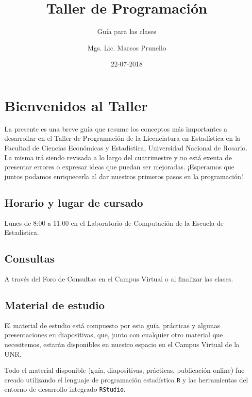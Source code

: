 \documentclass[]{book}
\title{Taller de Programación}
\subtitle{Guía para las clases}
\author{Mgs. Lic. Marcos Prunello}
\date{22-07-2018}
\begin{document}
\maketitle

{
\setcounter{tocdepth}{1}
\tableofcontents
}
\chapter{Bienvenidos al Taller}\label{bienvenidos-al-taller}

La presente es una breve guía que resume los conceptos más importantes a
desarrollar en el Taller de Programación de la Licenciatura en
Estadística en la Facultad de Ciencias Económicas y Estadística,
Universidad Nacional de Rosario. La misma irá siendo revisada a lo largo
del cuatrimestre y no está exenta de presentar errores o expresar ideas
que puedan ser mejoradas. ¡Esperamos que juntos podamos enriquecerla al
dar nuestros primeros pasos en la programación!

\section*{Horario y lugar de cursado}\label{horario-y-lugar-de-cursado}

Lunes de 8:00 a 11:00 en el Laboratorio de Computación de la Escuela de
Estadística.

\section*{Consultas}\label{consultas}

A través del Foro de Consultas en el Campus Virtual o al finalizar las
clases.

\section*{Material de estudio}\label{material-de-estudio}

El material de estudio está compuesto por esta guía, prácticas y algunas
presentaciones en diapositivas, que, junto con cualquier otro material
que necesitemos, estarán disponibles en nuestro espacio en el Campus
Virtual de la UNR.

Todo el material disponible (guía, diapositivas, prácticas, publicación
online) fue creado utilizando el lenguaje de programación estadística
\texttt{R} y las herramientas del entorno de desarrollo integrado
\texttt{RStudio}.
\end{document}
